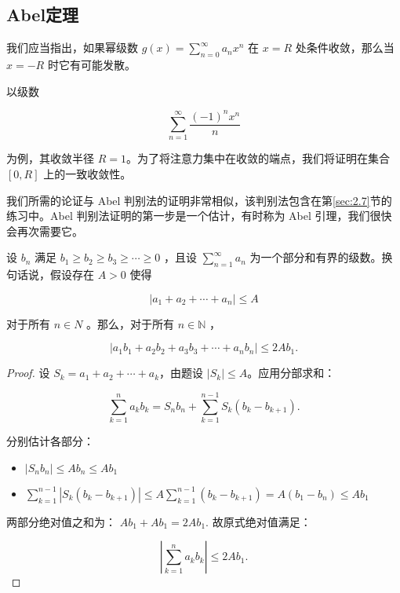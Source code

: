 \subsection{Abel定理}

我们应当指出，如果幂级数 \(g\left( x\right)  = \mathop{\sum }\limits_{{n = 0}}^{\infty }{a}_{n}{x}^{n}\) 在 \(x = R\) 处条件收敛，那么当 \(x =  - R\) 时它有可能发散。

以级数

\[
\mathop{\sum }\limits_{{n = 1}}^{\infty }\frac{{\left( -1\right) }^{n}{x}^{n}}{n}
\]

为例，其收敛半径 $R = 1$。为了将注意力集中在收敛的端点，我们将证明在集合 \(\left\lbrack  {0,R}\right\rbrack\) 上的一致收敛性。

我们所需的论证与 Abel 判别法的证明非常相似，该判别法包含在第\ref{sec:2.7}节的练习中。Abel 判别法证明的第一步是一个估计，有时称为 Abel 引理，我们很快会再次需要它。

\begin{Lem}[Abel引理]
  \label{lem:6.5.3}
  设 \({b}_{n}\) 满足 \({b}_{1} \geq  {b}_{2} \geq  {b}_{3} \geq  \cdots  \geq  0\) ，且设 \(\mathop{\sum }\limits_{{n = 1}}^{\infty }{a}_{n}\) 为一个部分和有界的级数。换句话说，假设存在 \(A > 0\) 使得

\[
\left| {{a}_{1} + {a}_{2} + \cdots  + {a}_{n}}\right|  \leq  A
\]

对于所有 \(n \in  N\) 。那么，对于所有 \(n \in  \mathbb{N}\) ，

\[
\left| {{a}_{1}{b}_{1} + {a}_{2}{b}_{2} + {a}_{3}{b}_{3} + \cdots  + {a}_{n}{b}_{n}}\right|  \leq  {2A}{b}_{1}.
\]
\end{Lem}

\begin{proof}
设 \(S_k = a_1 + a_2 + \cdots + a_k\)，由题设 \(|S_k| \leq A\)。应用分部求和：

\[
\sum_{k=1}^n a_k b_k = S_n b_n + \sum_{k=1}^{n-1} S_k (b_k - b_{k+1}).
\]

分别估计各部分：
\begin{itemize}
\item \(|S_n b_n| \leq A b_n \leq A b_1\)
\item \(\sum_{k=1}^{n-1} |S_k (b_k - b_{k+1})| \leq A \sum_{k=1}^{n-1} (b_k - b_{k+1}) = A(b_1 - b_n) \leq A b_1\)
\end{itemize}

两部分绝对值之和为：
\(
A b_1 + A b_1 = 2A b_1.
\)
故原式绝对值满足：

\[
\left|\sum_{k=1}^n a_k b_k\right| \leq 2A b_1.
\]
\end{proof}



